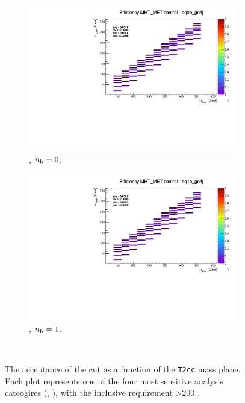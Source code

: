 \begin{figure}[h!]
\begin{subfigure}[b]{0.4\textwidth}
    \includegraphics[width=\textwidth, page=5]{Figs/sms/t2cc/v37/systs_v2/T2cc_MHT_MET_eq0b_ge4j.pdf}
    \caption{\njhigh, $n_{\text{b}} = 0$.}
  \end{subfigure}
  \begin{subfigure}[b]{0.4\textwidth}
    \includegraphics[width=\textwidth, page=5]{Figs/sms/t2cc/v37/systs_v2/T2cc_MHT_MET_eq1b_ge4j.pdf}
    \caption{\njhigh, $n_{\text{b}} = 1$.}
  \end{subfigure}\\
  \caption{The acceptance of the \mhtmet cut as a function of the \texttt{T2cc}
  mass plane. Each plot represents one of the four most sensitive 
  analysis cateogires (\nb, \nj), with the inclusive requirement \HT>200 \gev.}
  \label{fig:sms-mhtmet-t2cc}
\end{figure}


